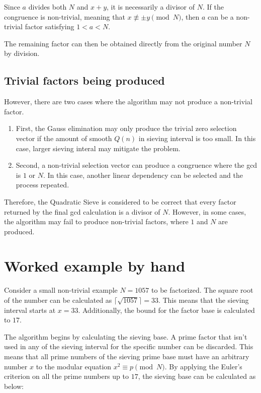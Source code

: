 \documentclass[11pt,a4paper]{article}
\begin{document}
Since $a$ divides both $N$ and $x+y$, it is necessarily a divisor of $N$. If the congruence is non-trivial, meaning that $x\not\equiv \pm y\pmod N$, then $a$ can be a non-trivial factor satisfying $1<a<N$.

The remaining factor can then be obtained directly from the original number $N$ by division.

\subsection*{Trivial factors being produced}
However, there are two cases where the algorithm may not produce a non-trivial factor. 

\begin{enumerate}
    \item First, the Gauss elimination may only produce the trivial zero selection vector if the amount of smooth $Q(n)$ in sieving interval is too small. In this case, larger sieving interal may mitigate the problem.
    \item Second, a non-trivial selection vector can produce a congruence where the gcd is $1$ or $N$. In this case, another linear dependency can be selected and the process repeated.
\end{enumerate}

Therefore, the Quadratic Sieve is considered to be correct that every factor returned by the final gcd calculation is a divisor of $N$. However, in some cases, the algorithm may fail to produce non-trivial factors, where $1$ and $N$ are produced.

\section*{Worked example by hand}

Consider a small non-trivial example $N=1057$ to be factorized. The square root of the number can be calculated as $\lceil \sqrt{1057} \rceil = 33$. This means that the sieving interval starts at $x=33$. Additionally, the bound for the factor base is calculated to $17$.

The algorithm begins by calculating the sieving base. A prime factor that isn't used in any of the sieving interval for the specific number can be discarded. This means that all prime numbers of the sieving prime base must have an arbitrary number $x$ to the modular equation $x^2 \equiv p \pmod N$. By applying the Euler's criterion on all the prime numbers up to $17$, the sieving base can be calculated as below:
\end{document}
